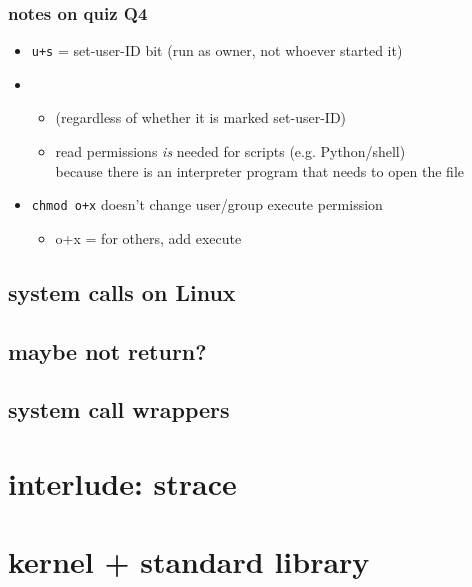 \begin{frame}
\frametitle{notes on quiz Q4}
\begin{itemize}
\item \texttt{u+s} = set-user-ID bit (run as owner, not whoever started it)
\item {}
    \begin{itemize}
    \item (regardless of whether it is marked set-user-ID)
    \item read permissions \textit{is} needed for scripts (e.g. Python/shell) \\
          because there is an interpreter program that needs to open the file
    \end{itemize}
\item \texttt{chmod o+x} doesn't change user/group execute permission
    \begin{itemize}
    \item o+x = for others, add execute
    \end{itemize}
\end{itemize}
\end{frame}





\subsection{system calls on Linux}


\subsection{maybe not return?}



\subsection{system call wrappers}

% 

\section{interlude: strace}


\section{kernel + standard library}


